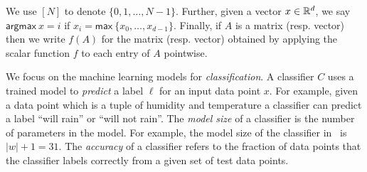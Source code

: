 We use $[N]$ to denote $\{0,1,\dotsc, N-1\}$. Further, given a vector
$x\in{\mathbb{R}}^d$, we say $\mathsf{argmax}\ x = i$ if $x_i =
\mathsf{max}\ \{x_0,\ldots,x_{d-1}\}$. Finally, if $A$ is
a matrix (resp. vector) then we write $f(A)$ for the matrix (resp. vector)
obtained by applying the scalar function $f$ to each entry of $A$
pointwise.

We focus on the machine
learning models for {\it classification}. A classifier $C$ uses a
trained model to {\it predict} a
label $\ell$ for an input data point $x$. For example, given a
data point which is a tuple of humidity and temperature 
a classifier can predict a label ``will rain'' or ``will not rain''.
The {\it model size} of a classifier is the number of parameters in the model.
For example, the model size of the classifier in~ is $|w|+1=31$.
The {\it
  accuracy} of a classifier refers to the fraction of data points that
the classifier labels correctly from a given set of test data
points.

